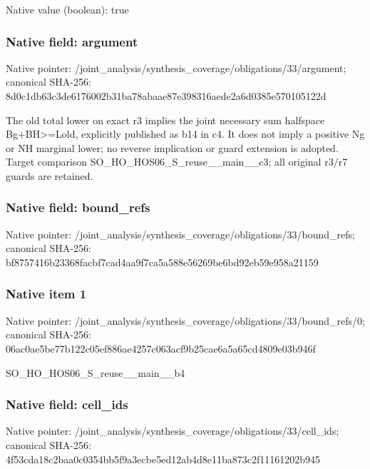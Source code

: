 \documentclass[10pt,a4paper]{article}
\begin{document}
Native value (boolean): true

\subsubsection{Native field: argument}
Native pointer: /joint\_\allowbreak{}analysis/synthesis\_\allowbreak{}coverage/obligations/33/argument; canonical SHA-256: 8d0c1db63c3de6176002b31ba78abaae87e398316aede2a6d0385e570105122d

\begingroup\raggedright\sloppy The old total lower on exact r3 implies the joint necessary sum halfspace Bg+BH>=\allowbreak{}Lold,\allowbreak{} explicitly published as b14 in c4. It does not imply a positive Ng or NH marginal lower;\allowbreak{} no reverse implication or guard extension is adopted. Target comparison SO\_\allowbreak{}HO\_\allowbreak{}HOS06\_\allowbreak{}S\_\allowbreak{}reuse\_\allowbreak{}\_\allowbreak{}main\_\allowbreak{}\_\allowbreak{}c3;\allowbreak{} all original r3/\allowbreak{}r7 guards are retained.\par\endgroup

\subsubsection{Native field: bound\_\allowbreak{}refs}
Native pointer: /joint\_\allowbreak{}analysis/synthesis\_\allowbreak{}coverage/obligations/33/bound\_\allowbreak{}refs; canonical SHA-256: bf8757416b23368facbf7cad4aa9f7ca5a588e56269be6bd92eb59e958a21159

\subsubsection{Native item 1}
Native pointer: /joint\_\allowbreak{}analysis/synthesis\_\allowbreak{}coverage/obligations/33/bound\_\allowbreak{}refs/0; canonical SHA-256: 06ac0ae5be77b122c05ef886ae4257c063acf9b25cae6a5a65cd4809e03b946f

\begingroup\raggedright\sloppy SO\_\allowbreak{}HO\_\allowbreak{}HOS06\_\allowbreak{}S\_\allowbreak{}reuse\_\allowbreak{}\_\allowbreak{}main\_\allowbreak{}\_\allowbreak{}b4\par\endgroup

\subsubsection{Native field: cell\_\allowbreak{}ids}
Native pointer: /joint\_\allowbreak{}analysis/synthesis\_\allowbreak{}coverage/obligations/33/cell\_\allowbreak{}ids; canonical SHA-256: 4f53cda18c2baa0c0354bb5f9a3ecbe5ed12ab4d8e11ba873c2f11161202b945
\end{document}
